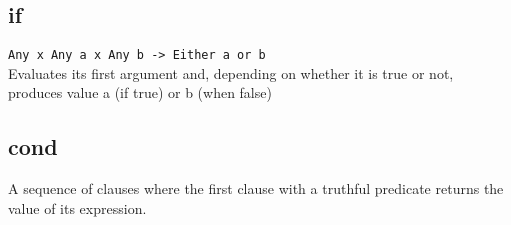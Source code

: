 
\subsection*{if}
\texttt{Any x Any a x Any b -> Either a or b}\\
\noindent Evaluates its first argument and, depending on whether it is true or not, produces value a (if true)
or b (when false)

\subsection*{cond}
A sequence of clauses where the first clause with a truthful predicate returns the value of its expression.


